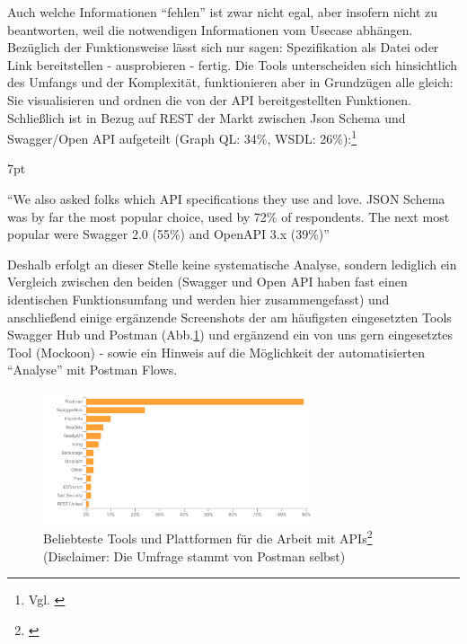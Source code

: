 \documentclass[notitlepage, hidelinks]{article}
\newenvironment{formal}{%
  \def\FrameCommand{%
    \hspace{1pt}%
    {\color{black}\vrule width 2pt}%
    {\color{formalshade}\vrule width 4pt}%
    \colorbox{formalshade}%
  }%
  \MakeFramed{\advance\hsize-\width\FrameRestore}%
  \noindent\hspace{-4.55pt}%
  \begin{adjustwidth}{}{7pt}%
  \vspace{2pt}\vspace{2pt}%
}
{%
  \vspace{2pt}\end{adjustwidth}\endMakeFramed%
}
\begin{document}
Auch welche Informationen ``fehlen'' ist zwar nicht egal, aber insofern nicht zu beantworten, weil die notwendigen Informationen vom Usecase abhängen. Bezüglich der Funktionsweise lässt sich nur sagen: Spezifikation als Datei oder Link bereitstellen - ausprobieren - fertig. Die Tools unterscheiden sich hinsichtlich des Umfangs und der Komplexität, funktionieren aber in Grundzügen alle gleich: Sie visualisieren und ordnen die von der API bereitgestellten Funktionen. Schließlich ist in Bezug auf REST der Markt zwischen Json Schema und Swagger/Open API aufgeteilt (Graph QL: 34\%, WSDL: 26\%):\footnote{Vgl. \cite{api-postman}}
\begin{formal}
``We also asked folks which API specifications they use and love. JSON Schema was by far the most popular choice, used by 72\% of respondents. The next most popular were Swagger 2.0 (55\%) and OpenAPI 3.x (39\%)''
\end{formal}

Deshalb erfolgt an dieser Stelle keine systematische Analyse, sondern lediglich ein Vergleich zwischen den beiden (Swagger und Open API haben fast einen identischen Funktionsumfang und werden hier zusammengefasst) und anschließend einige ergänzende Screenshots der am häufigsten eingesetzten Tools Swagger Hub und Postman (Abb.\ref{stateofapi2}) und ergänzend ein von uns gern eingesetztes Tool (Mockoon) - sowie ein Hinweis auf die Möglichkeit der automatisierten ``Analyse'' mit Postman Flows.


\begin{figure}[H]
\centering
  \includegraphics[width=300px]{images/stateofapi2.png}
  \caption{Beliebteste Tools und Plattformen für die Arbeit mit APIs\protect\footnote{\cite{api-postman}} (Disclaimer: Die Umfrage stammt von Postman selbst)}
  \label{stateofapi2}
\end{figure}
\end{document}
